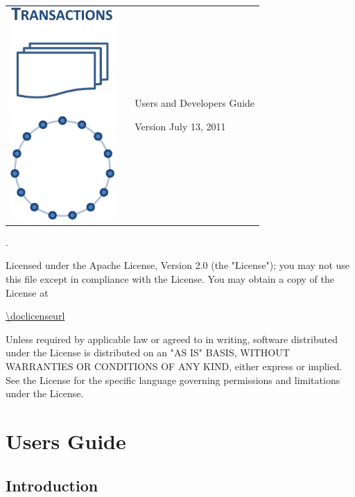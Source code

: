 \documentclass[a4paper]{scrreprt}
\begin{document}
\vspace*{4cm}
\thispagestyle{empty}
\setlength{\parskip}{1ex}
\begin{tabular}{p{4cm}p{0.5cm}p{10cm}}
\parbox{4cm}{\includegraphics[width=4cm]{scalaris-layers}}
& &\sffamily\bfseries\Huge
  \bigskip {\textcolor{rltblue}{\scalaris{}:}}

\medskip
 \mdseries Users and Developers Guide

\bigskip\medskip
\LARGE Version \docversion{} \hfill July 13, 2011\\
\end{tabular}
\vfill
{\scriptsize
\doccopyright{}.

Licensed under the Apache License, Version 2.0 (the "License");
you may not use this file except in compliance with the License.
You may obtain a copy of the License at

\url{\doclicenseurl}

Unless required by applicable law or agreed to in writing, software
distributed under the License is distributed on an "AS IS" BASIS,
WITHOUT WARRANTIES OR CONDITIONS OF ANY KIND, either express or implied.
See the License for the specific language governing permissions and
limitations under the License.
}

\tableofcontents

\part{Users Guide}

\chapter{Introduction}
\end{document}
